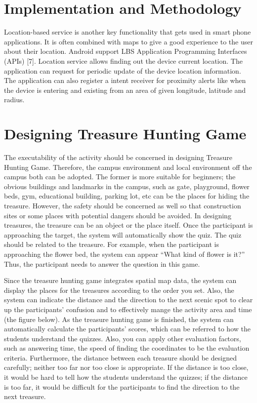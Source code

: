 \documentclass[12pt]{report}
\begin{document}
	\section{Implementation and Methodology}
	
	Location-based service is another key functionality that 
	gets used in smart phone applications. It is often combined 
	with maps to give a good experience to the user about their 
	location. 
	Android support LBS Application Programming Interfaces 
	(APIs) [7]. Location service allows finding out the device 
	current location. The application can request for periodic 
	update of the device location information. The application 
	can also register a intent receiver for proximity alerts like 
	when the device is entering and existing from an area of 
	given longitude, latitude and radius.
	
	

	
	
	
	\section{Designing Treasure Hunting Game}
	
	The executability of the activity should be concerned in designing Treasure Hunting Game. Therefore, the campus environment and local environment off the campus both can be adopted. The former is more suitable for beginners; the obvious buildings and landmarks in the campus, such as gate, playground, flower beds, gym, educational building, parking lot, etc can be the places for hiding the treasure. However, the safety should be concerned as well so that construction sites or some places with potential dangers should be avoided. In designing treasures, the treasure can be an object or the place itself. Once the participant is approaching the target, the system will automatically show the quiz. The quiz should be related to the treasure. For example, when the participant is approaching the flower bed, the system can appear “What kind of flower is it?” Thus, the participant needs to answer the question in this game. 
	
	Since the treasure hunting game integrates spatial map data, the system can display the places for the treasures according to the order you set. Also, the system can indicate the distance and the direction to the next scenic spot to clear up the participants’ confusion and to effectively mange the activity area and time (the figure below). As the treasure hunting game is finished, the system can automatically calculate the participants’ scores, which can be referred to how the students understand the quizzes. Also, you can apply other evaluation factors, such as answering time, the speed of finding the coordinates to be the evaluation criteria. Furthermore, the distance between each treasure should be designed carefully; neither too far nor too close is appropriate. If the distance is too close, it would be hard to tell how the students understand the quizzes; if the distance is too far, it would be difficult for the participants to find the direction to the next treasure.
	
\end{document}

